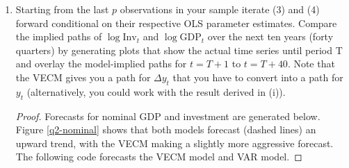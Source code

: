 \documentclass[oneside,reqno]{amsart}
\theoremstyle{definition}
\begin{document}
\begin{enumerate}[label=(\roman*)]
\begin{proof}
We now compute VAR coefficeints implied by the above estimates.
\begin{python3code}
# VAR implied by VECM 
vecm_res.var_rep
\end{python3code}

The implied estimates $\widetilde \Phi$ are
\begin{alignat*}{2}
	\widetilde \Phi_1 &= \begin{pmatrix}
		0.807 & 2.777 \\ 
		0.004 & 1.312
	\end{pmatrix} \qquad &&
	\widetilde \Phi_2= \begin{pmatrix}
		 0.172 & -1.590 \\ 
		0.012 & -0.167
	\end{pmatrix} \\
	\widetilde \Phi_3 &= \begin{pmatrix}
		 -0.016 & -1.821 \\ 
		-0.017 & -0.147
	\end{pmatrix} \qquad&&
	\widetilde \Phi_4  = \begin{pmatrix}
		-0.044 &  0.727  \\ 
		0.007 & -0.005 
	\end{pmatrix}.
\end{alignat*}
The VAR estimates implied by the VECM model $\widetilde \Phi$ differ only slightly from the $\widehat\Phi$ estimates. We get this result since $\Phi_1$ as define in (i) captures the cointegrating relation and $\Phi_2, \Phi_3$, and $\Phi_4$ capture the proposed white noise in the cointegrating residuals. \end{proof}

\item
Starting from the last $p$ observations in your sample iterate (3) and
(4) forward conditional on their respective OLS parameter estimates.
Compare the implied paths of $\log \text{Inv}_t$ and $\log \text{GDP}_t$ over the next ten years (forty quarters) by generating plots that show the actual time series until period T and overlay the model-implied paths for $t=T+1$
to $t = T + 40$. Note that the VECM gives you a path for $\Delta y_t$ that you have to convert into a path for $y_t$ (alternatively, you could work with the
result derived in (i)).

\begin{proof}
Forecasts for nominal GDP and investment are generated below. Figure \ref{q2-nominal} shows that both models forecast (dashed lines) an upward trend, with the VECM making a slightly more aggressive forecast. The following code forecasts the VECM model and VAR model. 


\end{proof}
\end{enumerate}
\end{document}
